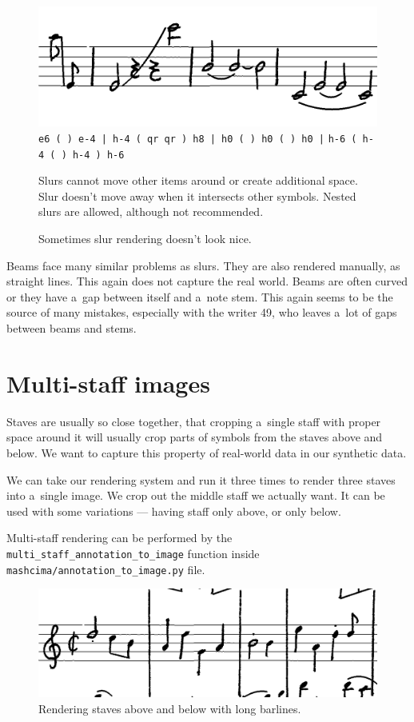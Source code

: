 \begin{figure}[h]
    \centering
    \includegraphics[width=120mm]{../img/failed-slurs}
    \verb`e6 ( ) e-4 | h-4 ( qr qr ) h8 | h0 ( ) h0 ( ) h0 |`
    \verb`h-6 ( h-4 ( ) h-4 ) h-6`
    \caption{Sometimes slur rendering doesn't look nice.}
    \label{fig5:FailedSlurs}
    \medskip
    \small
    Slurs cannot move other items around or create additional space. Slur doesn't move away when it intersects other symbols. Nested slurs are allowed, although not recommended.
\end{figure}

Beams face many similar problems as slurs. They are also rendered manually, as straight lines. This again does not capture the real world. Beams are often curved or they have a~gap between itself and a~note stem. This again seems to be the source of many mistakes, especially with the writer 49, who leaves a~lot of gaps between beams and stems.


\section{Multi-staff images}

Staves are usually so close together, that cropping a~single staff with proper space around it will usually crop parts of symbols from the staves above and below. We want to capture this property of real-world data in our synthetic data.

We can take our rendering system and run it three times to render three staves into a~single image. We crop out the middle staff we actually want. It can be used with some variations --- having staff only above, or only below.

Multi-staff rendering can be performed by the \verb`multi_`\allowbreak\verb`staff_`\allowbreak\verb`annotation_`\allowbreak\verb`to_image` function inside \verb`mashcima/`\allowbreak\verb`annotation_`\allowbreak\verb`to_image.py` file.

\begin{figure}[h]
    \centering
    \includegraphics[width=120mm]{../img/multi-staff}
    \caption{Rendering staves above and below with long barlines.}
    \label{fig5:MultiStaff}
\end{figure}


